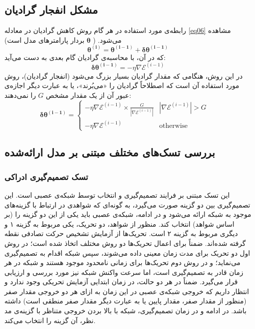 \documentclass[a4paper]{article}
\begin{document}
\subsection{مشکل انفجار گرادیان}
رابطه‌ی مورد استفاده در هر گام روش کاهش گرادیان در معادله \ref{eq06} مشاهده می‌شود. (
$\boldsymbol{\theta}$
بردار پارامترهای مدل است)
	\begin{equation}
		\boldsymbol{\theta^{(i)}} = \boldsymbol{\theta^{(i-1)}} + \boldsymbol{\delta\theta^{(i-1)}}
		\label{eq06}
	\end{equation}
که در آن، با محاسبه‌ی گرادیان گام بعدی به دست می‌آید:
\begin{equation}
	\boldsymbol{\delta\theta^{(i-1)}} = -\eta\nabla\mathcal{E}^{(i-1)}
	\label{eq07}
\end{equation}
در این روش، هنگامی که مقدار گرادیان بسیار بزرگ می‌شود (انفجار گرادیان)، روش مورد استفاده آن است که اصطلاحاً گرادیان را «می‌بُرند»، یا به عبارت دیگر اجازه‌ی عبور آن از یک مقدار مشخص $G$ را نمی‌دهند:
\begin{equation}
	\boldsymbol{\delta\theta^{(i-1)}} = \begin{cases}
	-\eta\nabla\mathcal{E}^{(i-1)}\times\frac{G}{|\nabla\mathcal{E}^{(i-1)}|}  & |\nabla\mathcal{E}^{(i-1)}|>G \\
	-\eta\nabla\mathcal{E}^{(i-1)}  & \text{otherwise }
\end{cases} \quad
	\label{eq08}
\end{equation}

\subsection{بررسی تسک‌های مختلف مبتنی بر مدل ارائه‌شده}
\subsubsection{تسک تصمیم‌گیری ادراکی}
این تسک مبتنی بر فرایند تصمیم‌گیری و انتخاب توسط شبکه‌ی عصبی است. این تصمیم‌گیری بین دو گزینه صورت می‌گیرد، به گونه‌ای که شواهدی در ارتباط با گزینه‌های موجود به شبکه ارائه می‌شود و در ادامه، شبکه‌ی عصبی باید یکی از این دو گزینه را (بر اساس شواهد) انتخاب کند. منظور از شواهد، دو تحریک، یکی مربوط به گزینه ۱ و دیگری مربوط به گزینه ۲ است. تحریک‌ها از آزمایش تشخیص حرکت تصادفی نقطه گرفته شده‌اند. ضمناً برای اعمال تحریک‌ها دو روش مختلف اتخاذ شده است؛ در روش اول دو تحریک برای مدت زمان معینی داده می‌شوند، سپس شبکه اقدام به تصمیم‌گیری می‌نماید؛ و در روش دوم تحریک‌ها برای زمانی نامحدود موجود هستند و شبکه در هر زمان قادر به تصمیم‌گیری است، اما سرعت واکنش شبکه نیز مورد بررسی و ارزیابی قرار می‌گیرد. ضمناً در هر دو حالت، در زمان ابتدایی آزمایش تحریکی وجود ندارد و انتظار داریم که خروجی شبکه‌ی عصبی در این زمان به ازای هر دو خروجی مقدار صفر (منظور از مقدار صفر، مقدار پایین یا به عبارت دیگر مقدار صفر منطقی است) داشته باشد. در ادامه و در زمان تصمیم‌گیری، شبکه با بالا بردن خروجی متناظر با گزینه‌ی مد نظر، آن گزینه را انتخاب می‌کند.\\
\end{document}
